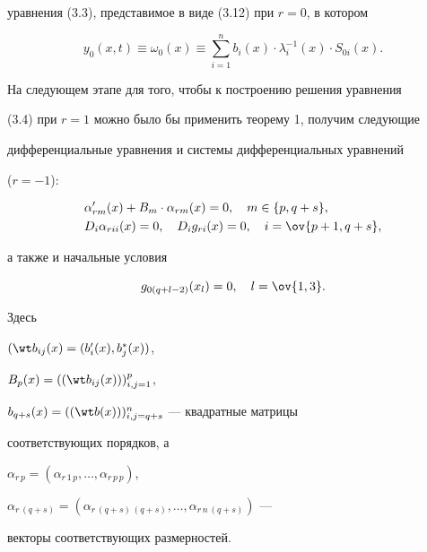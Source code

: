 уравнения (3.3), представимое в виде (3.12) при $r=0$, в котором 


$$


y_0(x,t)\equiv\omega_0(x)\equiv\sum^n_{i=1}b_i(x)\cdot


\lambda^{-1}_i(x)\cdot S_{0i}(x). 


$$


 


На следующем этапе для того, чтобы к построению решения уравнения 


(3.4) при $r=1$ можно было бы применить теорему 1, получим следующие 


дифференциальные уравнения и системы дифференциальных уравнений 


($r=-1$):


\begin{equation} 


\begin{split} 


&\alpha'_{rm}(x)+B_m\cdot\alpha_{rm}(x)=0,\quad 


m\in\{p,q+s\}, \\ 


&D_i\alpha_{rii}(x)=0,\quad D_i g_{ri}(x)=0,\quad 


i=\ov{p+1,q+s}, 


\end{split} 


\end{equation} 


а также и начальные условия 


\begin{equation} 


g_{0(q+l-2)}(x_l)=0,\quad l=\ov{1,3}. 


\end{equation} 


Здесь 


$(\wt b_{ij}(x)=(b'_i(x),b^*_j(x))$, 


$B_p(x)=((\wt b_{ij}(x)))^p_{i,j=1}$, 


$b_{q+s}(x)=((\wt b(x)))^n_{i,j=q+s}$ --- квадратные матрицы 


соответствующих порядков, а 


$\alpha_{r\,p}=(\alpha_{r\,1\,p},\dotsc,\alpha_{r\,p\,p})$, 


$\alpha_{r\,(q+s)}= 


(\alpha_{r\,(q+s)\,(q+s)},\dotsc,\alpha_{r\,n\,(q+s)})$ ---  


векторы соответствующих размерностей. 



